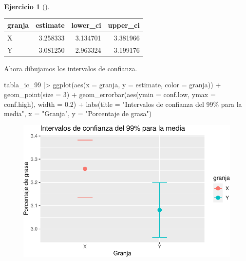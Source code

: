 \documentclass[
  a4paper,
]{scrreport}
\newenvironment{Shaded}{\begin{snugshade}}{\end{snugshade}}
\newcommand{\AttributeTok}[1]{\textcolor[rgb]{0.40,0.45,0.13}{#1}}
\newcommand{\DecValTok}[1]{\textcolor[rgb]{0.68,0.00,0.00}{#1}}
\newcommand{\FloatTok}[1]{\textcolor[rgb]{0.68,0.00,0.00}{#1}}
\newcommand{\FunctionTok}[1]{\textcolor[rgb]{0.28,0.35,0.67}{#1}}
\newcommand{\NormalTok}[1]{\textcolor[rgb]{0.00,0.23,0.31}{#1}}
\newcommand{\SpecialCharTok}[1]{\textcolor[rgb]{0.37,0.37,0.37}{#1}}
\newcommand{\StringTok}[1]{\textcolor[rgb]{0.13,0.47,0.30}{#1}}
\theoremstyle{definition}
\newtheorem{exercise}{Ejercicio}[chapter]
\theoremstyle{remark}
\begin{document}
\begin{exercise}[]
\begin{enumerate}
\begin{tcolorbox}
  \begin{longtable}[]{@{}lrrr@{}}
  \toprule\noalign{}
  granja & estimate & lower\_ci & upper\_ci \\
  \midrule\noalign{}
  \endhead
  \bottomrule\noalign{}
  \endlastfoot
  X & 3.258333 & 3.134701 & 3.381966 \\
  Y & 3.081250 & 2.963324 & 3.199176 \\
  \end{longtable}

  Ahora dibujamos los intervalos de confianza.

\begin{Shaded}
\begin{Highlighting}[]
\NormalTok{tabla\_ic\_99  }\SpecialCharTok{|\textgreater{}} 
    \FunctionTok{ggplot}\NormalTok{(}\FunctionTok{aes}\NormalTok{(}\AttributeTok{x =}\NormalTok{ granja, }\AttributeTok{y =}\NormalTok{ estimate, }\AttributeTok{color =}\NormalTok{ granja)) }\SpecialCharTok{+}
    \FunctionTok{geom\_point}\NormalTok{(}\AttributeTok{size =} \DecValTok{3}\NormalTok{) }\SpecialCharTok{+}
    \FunctionTok{geom\_errorbar}\NormalTok{(}\FunctionTok{aes}\NormalTok{(}\AttributeTok{ymin =}\NormalTok{ conf.low, }\AttributeTok{ymax =}\NormalTok{ conf.high), }\AttributeTok{width =} \FloatTok{0.2}\NormalTok{) }\SpecialCharTok{+}
    \FunctionTok{labs}\NormalTok{(}\AttributeTok{title =} \StringTok{"Intervalos de confianza del 99\% para la media"}\NormalTok{, }\AttributeTok{x =} \StringTok{"Granja"}\NormalTok{, }\AttributeTok{y =} \StringTok{"Porcentaje de grasa"}\NormalTok{)}
\end{Highlighting}
\end{Shaded}

  \begin{figure}[H]

  {\centering \includegraphics{07-intervalos-confianza-una-poblacion_files/figure-pdf/unnamed-chunk-16-1.pdf}

}
\end{figure}
\end{tcolorbox}
\end{enumerate}
\end{exercise}
\end{document}
